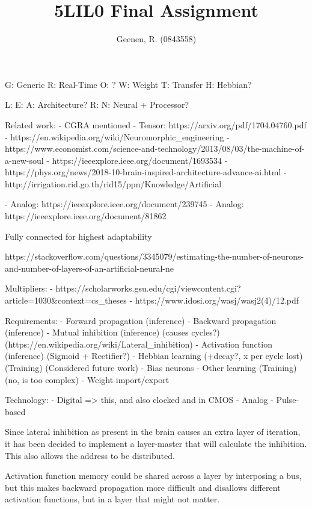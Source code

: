 \documentclass[twocolumn]{article}
\title{5LIL0 Final Assignment}
\author{Geenen, R. (0843558)}
\begin{document}
\maketitle

G: Generic
R: Real-Time
O: ?
W: Weight
T: Transfer
H: Hebbian?

L:
E:
A: Architecture?
R:
N: Neural
+ Processor?



Related work:
 - CGRA mentioned
 - Tensor: https://arxiv.org/pdf/1704.04760.pdf
 - https://en.wikipedia.org/wiki/Neuromorphic_engineering
 - https://www.economist.com/science-and-technology/2013/08/03/the-machine-of-a-new-soul
 - https://ieeexplore.ieee.org/document/1693534
 - https://phys.org/news/2018-10-brain-inspired-architecture-advance-ai.html
 - http://irrigation.rid.go.th/rid15/ppn/Knowledge/Artificial%

 - Analog: https://ieeexplore.ieee.org/document/239745
 - Analog: https://ieeexplore.ieee.org/document/81862

Fully connected for highest adaptability

 
 https://stackoverflow.com/questions/3345079/estimating-the-number-of-neurons-and-number-of-layers-of-an-artificial-neural-ne
 
 
 
Multipliers:
 - https://scholarworks.gsu.edu/cgi/viewcontent.cgi?article=1030&context=cs_theses
 - https://www.idosi.org/wasj/wasj2(4)/12.pdf
 
 
 
Requirements:
 - Forward propagation (inference)
 - Backward propagation (inference)
 - Mutual inhibition (inference) (causes cycles?) (https://en.wikipedia.org/wiki/Lateral_inhibition)
 - Activation function (inference) (Sigmoid + Rectifier?)
 - Hebbian learning (+decay?, x per cycle lost) (Training) (Considered future work)
 - Bias neurons
 - Other learning (Training) (no, is too complex)
 - Weight import/export
 
Technology:
 - Digital => this, and also clocked and in CMOS
 - Analog
 - Pulse-based


Since lateral inhibition as present in the brain causes an extra layer of iteration, it has been decided to implement a layer-master that will calculate the inhibition. This also allows the address to be distributed.

Activation function memory could be shared across a layer by interposing a bus, but this makes backward propagation more difficult and disallows different activation functions, but in a layer that might not matter.
\end{document}
